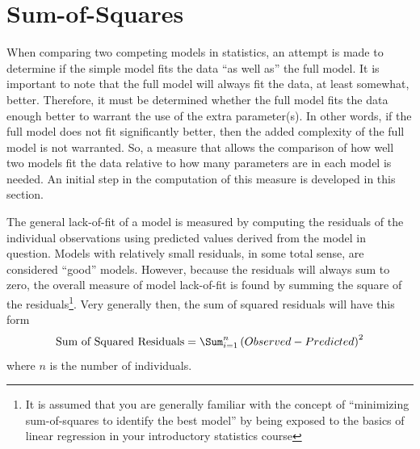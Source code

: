 \documentclass[10pt,openany]{book}\usepackage[]{graphicx}\usepackage[]{color}
\begin{document}

\vspace{-12pt}

\section{Sum-of-Squares}
When comparing two competing models in statistics, an attempt is made to determine if the simple model fits the data ``as well as'' the full model.  It is important to note that the full model will always fit the data, at least somewhat, better.  Therefore, it must be determined whether the full model fits the data enough better to warrant the use of the extra parameter(s).  In other words, if the full model does not fit significantly better, then the added complexity of the full model is not warranted.  So, a measure that allows the comparison of how well two models fit the data relative to how many parameters are in each model is needed.  An initial step in the computation of this measure is developed in this section.

The general lack-of-fit of a model is measured by computing the residuals of the individual observations using predicted values derived from the model in question.  Models with relatively small residuals, in some total sense, are considered ``good'' models.  However, because the residuals will always sum to zero, the overall measure of model lack-of-fit is found by summing the square of the residuals\footnote{It is assumed that you are generally familiar with the concept of ``minimizing sum-of-squares to identify the best model'' by being exposed to the basics of linear regression in your introductory statistics course}.  Very generally then, the sum of squared residuals will have this form
\begin{equation} \label{eqn:GeneralSS}
  \text{Sum of Squared Residuals} = \Sum_{i=1}^{n}\left(Observed-Predicted\right)^2
\end{equation}
where $n$ is the number of individuals.

\end{document}

